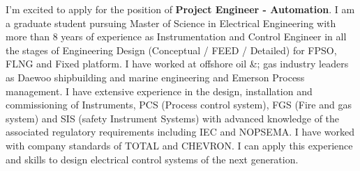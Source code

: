 \documentclass[11pt, a4paper]{ishan-cl} %
\newcommand{\positionname}{\textbf{Project Engineer - Automation}}%
\begin{document}
	
	\makecvheader %
	\makelettertitle %
	
	
	\begin{cvletter}
		
		I’m excited to apply for the position of \textbf{\positionname}. %
		I am a graduate student pursuing Master of Science in Electrical Engineering with more than 8
		years of experience as Instrumentation and Control Engineer in all the stages of Engineering
		Design (Conceptual / FEED / Detailed) for FPSO, FLNG and Fixed platform. I have worked at
		offshore oil \&; gas industry leaders as Daewoo shipbuilding and marine engineering and
		Emerson Process management. I have extensive experience in the design, installation and
		commissioning of Instruments, PCS (Process control system), FGS (Fire and gas system) and
		SIS (safety Instrument Systems) with advanced knowledge of the associated regulatory
		requirements including IEC and NOPSEMA. I have worked with company standards of TOTAL
		and CHEVRON. I can apply this experience and skills to design electrical control systems of the
		next generation.
		
	\end{cvletter}
	
	\makeletterclosing %
\end{document}
